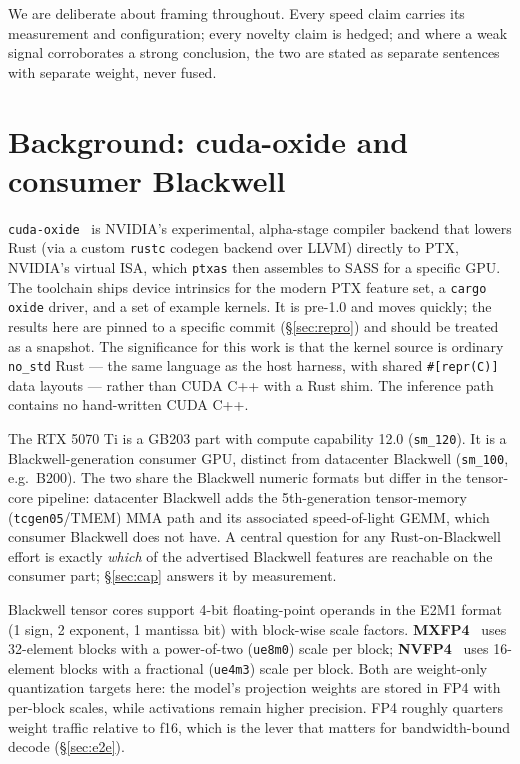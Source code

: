 \documentclass[11pt]{article}
\begin{document}
We are deliberate about framing throughout. Every speed claim carries its measurement and configuration; every novelty claim is hedged; and where a weak signal corroborates a strong conclusion, the two are stated as separate sentences with separate weight, never fused.

\section{Background: cuda-oxide and consumer Blackwell}
\texttt{cuda-oxide}~\citep{cudaoxide} is NVIDIA's experimental, alpha-stage compiler backend that lowers Rust (via a custom \texttt{rustc} codegen backend over LLVM) directly to PTX, NVIDIA's virtual ISA, which \texttt{ptxas} then assembles to SASS for a specific GPU. The toolchain ships device intrinsics for the modern PTX feature set, a \texttt{cargo oxide} driver, and a set of example kernels. It is pre-1.0 and moves quickly; the results here are pinned to a specific commit (\S\ref{sec:repro}) and should be treated as a snapshot. The significance for this work is that the kernel source is ordinary \texttt{no\_std} Rust --- the same language as the host harness, with shared \texttt{\#[repr(C)]} data layouts --- rather than CUDA C++ with a Rust shim. The inference path contains no hand-written CUDA C++.

The RTX 5070 Ti is a GB203 part with compute capability 12.0 (\texttt{sm\_120}). It is a Blackwell-generation consumer GPU, distinct from datacenter Blackwell (\texttt{sm\_100}, e.g.\ B200). The two share the Blackwell numeric formats but differ in the tensor-core pipeline: datacenter Blackwell adds the 5th-generation tensor-memory (\texttt{tcgen05}/TMEM) MMA path and its associated speed-of-light GEMM, which consumer Blackwell does not have. A central question for any Rust-on-Blackwell effort is exactly \emph{which} of the advertised Blackwell features are reachable on the consumer part; \S\ref{sec:cap} answers it by measurement.

Blackwell tensor cores support 4-bit floating-point operands in the E2M1 format (1 sign, 2 exponent, 1 mantissa bit) with block-wise scale factors. \textbf{MXFP4}~\citep{ocpmx} uses 32-element blocks with a power-of-two (\texttt{ue8m0}) scale per block; \textbf{NVFP4}~\citep{ptxisa} uses 16-element blocks with a fractional (\texttt{ue4m3}) scale per block. Both are weight-only quantization targets here: the model's projection weights are stored in FP4 with per-block scales, while activations remain higher precision. FP4 roughly quarters weight traffic relative to f16, which is the lever that matters for bandwidth-bound decode (\S\ref{sec:e2e}).
\end{document}
